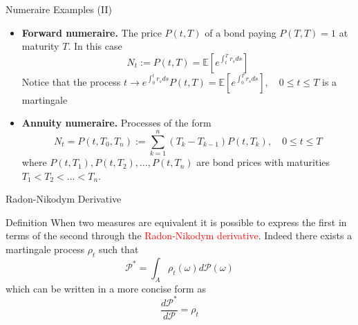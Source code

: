 \documentclass{beamer}
\begin{document}
\begin{frame}{Numeraire Examples (II)}
	\begin{itemize}
		\item \textbf{Forward numeraire.} The price $P(t,T)$ of a bond paying $P(T,T)=1$ at maturity $T$. In this case
		\begin{equation*}
			N_t := P(t,T)=\mathbb{E}\left[e^{\int_t^T r_s ds}\right]
		\end{equation*}
		Notice that the process $t\rightarrow e^{\int_0^t r_s ds} P(t,T)=\mathbb{E}\left[e^{\int_0^T r_s ds}\right], \quad 0 \le t \le T$
		is a martingale
		\item \textbf{Annuity numeraire.} Processes of the form
		\begin{equation*}
			N_t = P(t, T_0, T_n) := \sum_{k=1}^{n}(T_k - T_{k-1})P(t, T_k), \quad 0 \le t \le T
		\end{equation*}
		where $P(t,T_1),P(t,T_2),\ldots,P(t,T_n)$ are bond prices with maturities $T_1 < T_2 < \ldots < T_n$.
	\end{itemize}
\end{frame}

\begin{frame}{Radon-Nikodym Derivative}
\begin{block}{Definition}
When two measures are equivalent it is possible to express the first in terms of the second through the \textcolor{red}{Radon-Nikodym derivative}. Indeed there exists a martingale process $\rho_t$ such that
\begin{equation*}
	\mathcal{P}^* =\int_{A} \rho_t(\omega)d\mathcal{P}(\omega)
\end{equation*}
which can be written in a more concise form as
\begin{equation}
	\frac{d\mathcal{P}^*}{d\mathcal{P}} = \rho_t
	\label{eq:radon_nikodym_der}
\end{equation}
\end{block}
\end{frame}
\end{document}
